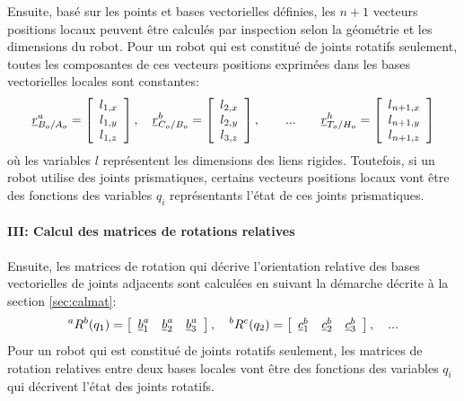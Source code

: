 Ensuite, basé sur les points et bases vectorielles définies, les $n+1$ vecteurs positions locaux peuvent être calculés par inspection selon la géométrie et les dimensions du robot. Pour un robot qui est constitué de joints rotatifs seulement, toutes les composantes de ces vecteurs positions exprimées dans les bases vectorielles locales sont constantes:
\begin{align}
\underline{r}_{B_o/A_o}^a = 
\left[ \begin{array}{c} 
l_{1,x} \\ l_{1,y} \\ l_{1,z}
\end{array} \right], \quad
\underline{r}_{C_o/B_o}^b = 
\left[ \begin{array}{c} 
l_{2,x} \\ l_{2,y} \\ l_{3,z}
\end{array} \right], \quad\quad ... \quad\quad
\underline{r}_{T_o/H_o}^h = 
\left[ \begin{array}{c} 
l_{n+1,x} \\ l_{n+1,y} \\ l_{n+1,z}
\end{array} \right]
\end{align} 
où les variables $l$ représentent les dimensions des liens rigides. Toutefois, si un robot utilise des joints prismatiques, certains vecteurs positions locaux vont être des fonctions des variables $q_i$ représentants l'état de ces joints prismatiques.

\paragraph{III: Calcul des matrices de rotations relatives}

Ensuite, les matrices de rotation qui décrive l'orientation relative des bases vectorielles de joints adjacents sont calculées en suivant la démarche décrite à la section \ref{sec:calmat}:
\begin{align}
{}^aR^b( q_1 ) = \left[ \begin{array}{c c c} 
\underline{b}_1^a &
\underline{b}_2^a &
\underline{b}_3^a
\end{array} \right],
\quad
{}^bR^c( q_2 ) = \left[ \begin{array}{c c c}
\underline{c}_1^b &
\underline{c}_2^b &
\underline{c}_3^b
\end{array} \right],
\quad ... 
\end{align} 
Pour un robot qui est constitué de joints rotatifs seulement, les matrices de rotation relatives entre deux bases locales vont être des fonctions des variables $q_i$ qui décrivent l'état des joints rotatifs.


